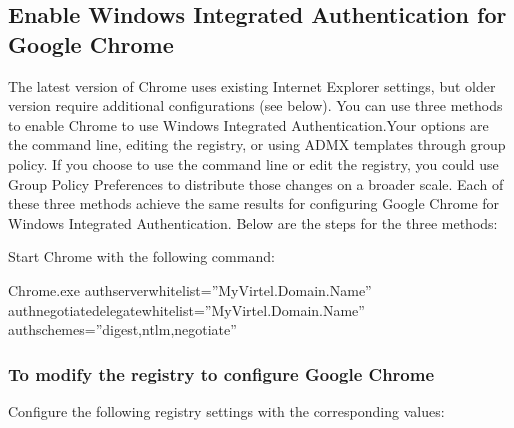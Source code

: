\documentclass[letterpaper,10pt,english]{sphinxmanual}
\begin{document}
\subsection{Enable Windows Integrated Authentication for Google Chrome}
\label{\detokenize{Customization:enable-windows-integrated-authentication-for-google-chrome}}
The latest version of Chrome uses existing Internet Explorer settings, but older version require additional configurations (see below). You can use three methods to enable Chrome to use Windows Integrated Authentication.Your options are the command line, editing the registry, or using ADMX templates through group policy. If you choose to use the command line or edit the registry, you could use Group Policy Preferences to distribute those changes on a broader scale. Each of these three methods achieve the same results for configuring Google Chrome for Windows Integrated Authentication. Below are the steps for the three methods:


Start Chrome with the following command:

\begin{sphinxVerbatim}[commandchars=\\\{\}]
Chrome.exe  \textendash{}auth\PYGZhy{}server\PYGZhy{}whitelist=”MyVirtel.Domain.Name”
            \textendash{}auth\PYGZhy{}negotiate\PYGZhy{}delegatewhitelist=”MyVirtel.Domain.Name”
            \textendash{}auth\PYGZhy{}schemes=”digest,ntlm,negotiate”
\end{sphinxVerbatim}


\subsubsection{To modify the registry to configure Google Chrome}
\label{\detokenize{Customization:to-modify-the-registry-to-configure-google-chrome}}
Configure the following registry settings with the corresponding values:
\end{document}
